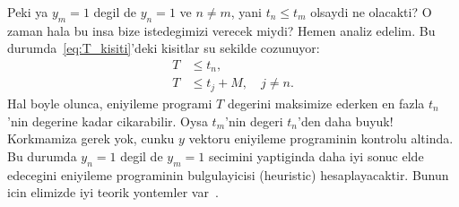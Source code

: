 Peki ya $y_m = 1$ degil de $y_n = 1$ ve $n \neq m$, yani $t_n \leq t_m$ olsaydi
ne olacakti? O zaman hala bu insa bize istedegimizi verecek miydi? Hemen analiz
edelim. Bu durumda~\eqref{eq:T_kisiti}'deki kisitlar su sekilde cozunuyor:
%
\begin{align*}
    T &\leq t_n, \\
    T &\leq t_j + M, \quad j \neq n.
\end{align*}
%
Hal boyle olunca, eniyileme programi $T$ degerini maksimize ederken en fazla
$t_n$'nin degerine kadar cikarabilir. Oysa $t_m$'nin degeri $t_n$'den daha
buyuk! Korkmamiza gerek yok, cunku $y$ vektoru eniyileme programinin kontrolu
altinda. Bu durumda $y_n = 1$ degil de $y_m = 1$ secimini yaptiginda daha iyi
sonuc elde edecegini eniyileme programinin bulgulayicisi (heuristic)
hesaplayacaktir. Bunun icin elimizde iyi teorik yontemler
var~\cite{griva2009linear}.


